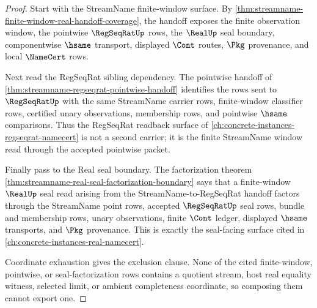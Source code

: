 \begin{proof}
Start with the StreamName finite-window surface. By \autoref{thm:streamname-finite-window-real-handoff-coverage}, the handoff exposes the finite observation window, the pointwise $\RegSeqRatUp$ rows, the $\RealUp$ seal boundary, componentwise $\hsame$ transport, displayed $\Cont$ routes, $\Pkg$ provenance, and local $\NameCert$ rows.

Next read the RegSeqRat sibling dependency. The pointwise handoff of \autoref{thm:streamname-regseqrat-pointwise-handoff} identifies the rows sent to $\RegSeqRatUp$ with the same StreamName carrier rows, finite-window classifier rows, certified unary observations, membership rows, and pointwise $\hsame$ comparisons. Thus the RegSeqRat readback surface of \autoref{ch:concrete-instances-regseqrat-namecert} is not a second carrier; it is the finite StreamName window read through the accepted pointwise packet.

Finally pass to the Real seal boundary. The factorization theorem \autoref{thm:streamname-real-seal-factorization-boundary} says that a finite-window $\RealUp$ seal read arising from the StreamName-to-RegSeqRat handoff factors through the StreamName point rows, accepted $\RegSeqRatUp$ seal rows, bundle and membership rows, unary observations, finite $\Cont$ ledger, displayed $\hsame$ transports, and $\Pkg$ provenance. This is exactly the seal-facing surface cited in \autoref{ch:concrete-instances-real-namecert}.

Coordinate exhaustion gives the exclusion clause. None of the cited finite-window, pointwise, or seal-factorization rows contains a quotient stream, host real equality witness, selected limit, or ambient completeness coordinate, so composing them cannot export one.
\end{proof}


